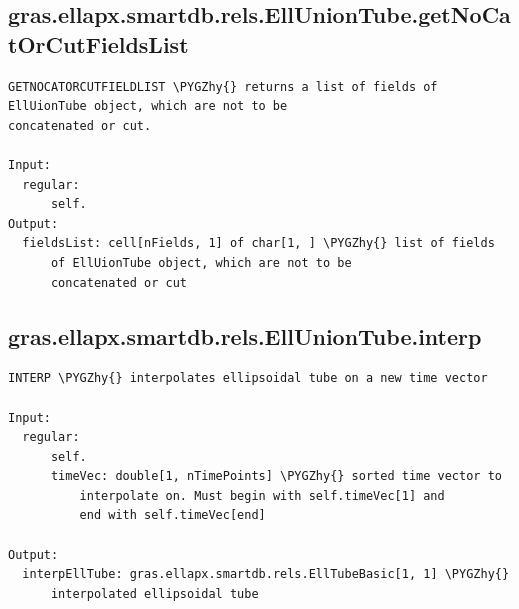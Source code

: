 \documentclass[letterpaper,10pt,english]{sphinxmanual}
\def\PYGZhy{\char`\-}
\begin{document}
\subsection{gras.ellapx.smartdb.rels.EllUnionTube.getNoCatOrCutFieldsList}
\label{chap_functions:gras-ellapx-smartdb-rels-elluniontube-getnocatorcutfieldslist}
\begin{Verbatim}[commandchars=\\\{\}]
GETNOCATORCUTFIELDLIST \PYGZhy{} returns a list of fields of
EllUionTube object, which are not to be
concatenated or cut.

Input:
  regular:
      self.
Output:
  fieldsList: cell[nFields, 1] of char[1, ] \PYGZhy{} list of fields
      of EllUionTube object, which are not to be
      concatenated or cut
\end{Verbatim}


\subsection{gras.ellapx.smartdb.rels.EllUnionTube.interp}
\label{chap_functions:gras-ellapx-smartdb-rels-elluniontube-interp}
\begin{Verbatim}[commandchars=\\\{\}]
INTERP \PYGZhy{} interpolates ellipsoidal tube on a new time vector

Input:
  regular:
      self.
      timeVec: double[1, nTimePoints] \PYGZhy{} sorted time vector to
          interpolate on. Must begin with self.timeVec[1] and
          end with self.timeVec[end]

Output:
  interpEllTube: gras.ellapx.smartdb.rels.EllTubeBasic[1, 1] \PYGZhy{}
      interpolated ellipsoidal tube
\end{Verbatim}
\end{document}
